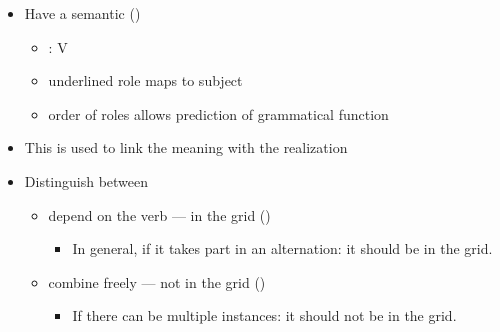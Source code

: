 \documentclass[headrule,footrule]{foils}
\begin{document}
\begin{itemize}\addtolength{\itemsep}{-1ex}
\item Have a semantic 
  () %

 \begin{itemize}
 \item  {}: V 
 \item  underlined role maps to subject
 \item  order of roles allows prediction of grammatical function
 \end{itemize}
\item  This is used to link the meaning with the realization
\item Distinguish between
  \begin{itemize}
  \item {} depend on the verb --- in the grid ()
    \begin{itemize}
    \item In general, if it takes part in an alternation: it should be in the grid.
    \end{itemize}
  \item {} combine freely --- not in the grid ()
    \begin{itemize}
    \item If there can be multiple instances: it should not be in the grid.
    \end{itemize}
 
  \end{itemize}
\end{itemize}
  


\end{document}

